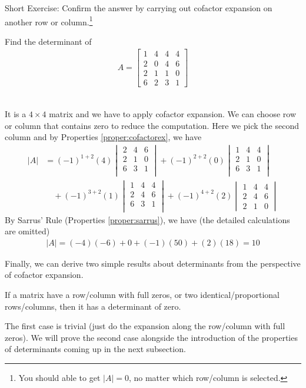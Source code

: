 Short Exercise: Confirm the answer by carrying out cofactor expansion on another row or column.\footnote{You should able to get $|A| = 0$, no matter which row/column is selected.}
\begin{exmp}
\label{exmp:4x4det}
Find the determinant of
\begin{align*}
A = 
\begin{bmatrix}
1 & 4 & 4 & 4 \\
2 & 0 & 4 & 6 \\
2 & 1 & 1 & 0 \\
6 & 2 & 3 & 1
\end{bmatrix}
\end{align*}\
\end{exmp}
\begin{solution}
It is a $4 \times 4$ matrix and we have to apply cofactor expansion. We can choose row or column that contains zero to reduce the computation. Here we pick the second column and by Properties \ref{proper:cofactorex}, we have
\begin{align*}
|A| &= (-1)^{1+2}(4)
\begin{vmatrix}
2 & 4 & 6 \\
2 & 1 & 0 \\
6 & 3 & 1 \\
\end{vmatrix}
+ (-1)^{2+2}(0)
\begin{vmatrix}
1 & 4 & 4 \\
2 & 1 & 0 \\
6 & 3 & 1 \\
\end{vmatrix} \\
&\quad + (-1)^{3+2}(1) 
\begin{vmatrix}
1 & 4 & 4 \\
2 & 4 & 6 \\
6 & 3 & 1 \\
\end{vmatrix} 
+ (-1)^{4+2}(2)
\begin{vmatrix}
1 & 4 & 4 \\
2 & 4 & 6 \\
2 & 1 & 0
\end{vmatrix} 
\end{align*}
By Sarrus' Rule (Properties \ref{proper:sarrus}), we have (the detailed calculations are omitted) 
\begin{align*}
|A| = (-4)(-6) + 0 + (-1)(50) + (2)(18) = 10
\end{align*}
\end{solution}
Finally, we can derive two simple results about determinants from the perspective of cofactor expansion.
\begin{proper}
\label{proper:zerodet}
If a matrix have a row/column with full zeros, or two identical/proportional rows/columns, then it has a determinant of zero.
\end{proper}
The first case is trivial (just do the expansion along the row/column with full zeros). We will prove the second case alongside the introduction of the properties of determinants coming up in the next subsection.

